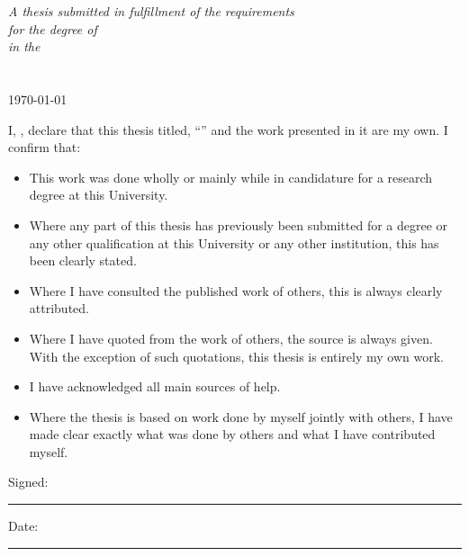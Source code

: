 \documentclass[
11pt, %
english, %
singlespacing, %
liststotoc, %
headsepline, %
]{MastersDoctoralThesis} %
\begin{document}
\begin{titlepage}
\begin{center}
\large \textit{A thesis submitted in fulfillment of the requirements\\ for the degree of \degreename}\\[0.3cm] %
\textit{in the}\\[0.4cm]
\groupname\\\deptname\\[2cm] %
 
{\large \today}\\[4cm] %


 
\vfill
\end{center}
\end{titlepage}


\begin{declaration}
\addchaptertocentry{\authorshipname} %
\noindent I, \authorname, declare that this thesis titled, \enquote{\ttitle} and the work presented in it are my own. I confirm that:

\begin{itemize} 
\item This work was done wholly or mainly while in candidature for a research degree at this University.
\item Where any part of this thesis has previously been submitted for a degree or any other qualification at this University or any other institution, this has been clearly stated.
\item Where I have consulted the published work of others, this is always clearly attributed.
\item Where I have quoted from the work of others, the source is always given. With the exception of such quotations, this thesis is entirely my own work.
\item I have acknowledged all main sources of help.
\item Where the thesis is based on work done by myself jointly with others, I have made clear exactly what was done by others and what I have contributed myself.\\
\end{itemize}
 
\noindent Signed:\\
\rule[0.5em]{25em}{0.5pt} %
 
\noindent Date:\\
\rule[0.5em]{25em}{0.5pt} %
\end{declaration}
\end{document}
